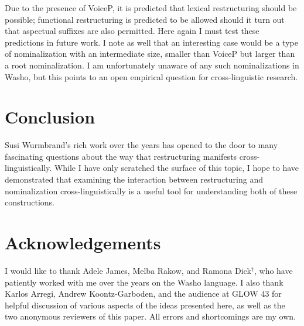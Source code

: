 \documentclass[output=paper]{langscibook}
\begin{document}
Due to the presence of VoiceP, it is predicted that lexical restructuring should be possible; functional restructuring is predicted to be allowed should it turn out that aspectual suffixes are also permitted. Here again I must test these predictions in future work. I note as well that an interesting case would be a type of nominalization with an intermediate size, smaller than VoiceP but larger than a root nominalization. I am unfortunately unaware of any such nominalizations in Washo, but this points to an  open empirical question for cross-linguistic research. 

 \section{Conclusion}
 
 


 Susi Wurmbrand's rich work over the years has opened to the door to many fascinating questions about the way that restructuring manifests cross-linguistically. While I have only scratched  the surface of this topic, I hope to have demonstrated that examining the interaction between restructuring and nominalization cross-linguistically is a useful tool for understanding both of these constructions.



\section*{Acknowledgements}
I would like to thank Adele James, Melba Rakow, and Ramona Dick$^{\dag}$, who have patiently worked with me over the years on the Washo language. I also thank Karlos Arregi, Andrew Koontz-Garboden, and the audience at GLOW 43 for helpful discussion of various aspects of the ideas presented here, as well as the two anonymous reviewers of this paper. All errors and shortcomings are my own.
\end{document}

